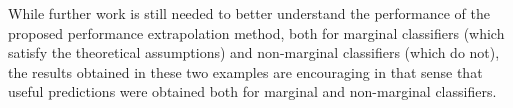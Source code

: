 While further work is still needed to better understand the
performance of the proposed performance extrapolation method, both for
marginal classifiers (which satisfy the theoretical assumptions) and
non-marginal classifiers (which do not), the results obtained in these
two examples are encouraging in that sense that useful predictions
were obtained both for marginal and non-marginal classifiers.
